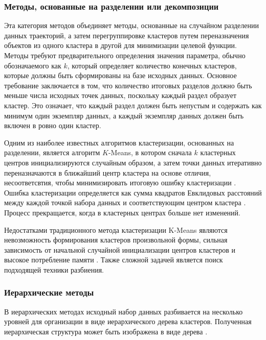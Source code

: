 \subsubsection{Методы, основанные на разделении или декомпозиции}

Эта категория методов объединяет методы, основанные на случайном разделении данных траекторий, а затем перегруппировке кластеров путем переназначения объектов из одного кластера в другой для минимизации целевой функции. Методы требуют предварительного определения значения параметра, обычно обозначаемого как $k$, который определяет количество конечных кластеров, которые должны быть сформированы на базе исходных данных. Основное требование заключается в том, что количество итоговых разделов должно быть меньше числа исходных точек данных, поскольку каждый раздел образует кластер. Это означает, что каждый раздел должен быть непустым и содержать как минимум один экземпляр данных, а каждый экземпляр данных должен быть включен в ровно один кластер.

Одним из наиболее известных алгоритмов кластеризации, основанных на разделении, является алгоритм $K$-Means, в котором сначала $k$ кластерных центров инициализируются случайным образом, а затем точки данных итеративно переназначаются в ближайший центр кластера на основе отличия, несоответсвтия, чтобы минимизировать итоговую ошибку кластеризации \cite{article:23_survey_ca}. Ошибка кластеризации определяется как сумма квадратов Евклидовых расстояний между каждой точкой набора данных и соответствующим центром кластера \cite{article:24_glkkm_cl_fs}. Процесс прекращается, когда в кластерных центрах больше нет изменений.

Недостатками традиционного метода кластеризации K-Means являются невозможность формирования кластеров произвольной формы, сильная зависимость от начальной случайной инициализации центров кластеров и высокое потребление памяти \cite{article:8_review_mot_cl_alg}. Также сложной задачей является поиск подходящей техники разбиения.

\subsubsection{Иерархические методы}

В иерархических методах исходный набор данных разбивается на несколько уровней для организации в виде иерархического дерева кластеров. Полученная иерархическая структура может быть изображена в виде дерева \cite{article:23_survey_ca}.

